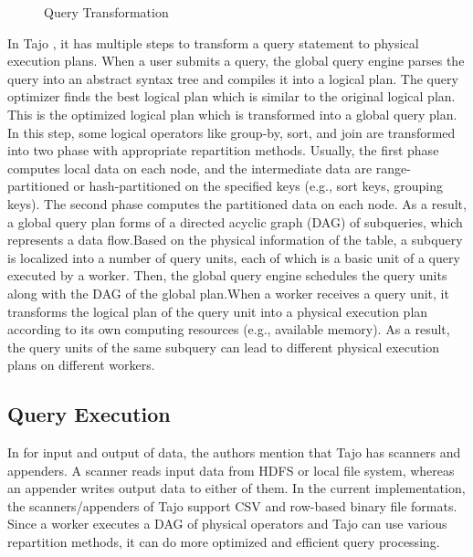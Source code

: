 \documentclass[9pt,twocolumn,twoside]{styles/osajnl}
\begin{document}
\begin{figure}[htbp]
\centering
{}
\caption{\cite{tajo-paper} Query Transformation}
\label{fig:queryplanning}
\end{figure}

\noindent
In Tajo \cite{tajo-paper} \cite{www-apache-tajo}, it has multiple
steps to transform a query statement to physical execution plans. When
a user submits a query, the global query engine parses the query into
an abstract syntax tree and compiles it into a logical plan. The query
optimizer finds the best logical plan which is similar to the original
logical plan. This is the optimized logical plan which is transformed
into a global query plan. In this step, some logical operators like
group-by, sort, and join are transformed into two phase with
appropriate repartition methods. Usually, the first phase computes
local data on each node, and the intermediate data are
range-partitioned or hash-partitioned on the specified keys (e.g.,
sort keys, grouping keys). The second phase computes the partitioned
data on each node. As a result, a global query plan forms of a
directed acyclic graph (DAG) of subqueries, which represents a data
flow.Based on the physical information of the table, a subquery is
localized into a number of query units, each of which is a basic unit
of a query executed by a worker. Then, the global query engine
schedules the query units along with the DAG of the global
plan.\newline \newline When a worker receives a query unit, it
transforms the logical plan of the query unit into a physical
execution plan according to its own computing resources (e.g.,
available memory). As a result, the query units of the same subquery
can lead to different physical execution plans on different workers.

\subsection{Query Execution}
In \cite{tajo-paper} for input and output of data, the authors mention
that Tajo has scanners and appenders. A scanner reads input data from
HDFS or local file system, whereas an appender writes output data to
either of them. In the current implementation, the scanners/appenders
of Tajo support CSV and row-based binary file formats. Since a worker
executes a DAG of physical operators and Tajo can use various
repartition methods, it can do more optimized and efficient query
processing.
\end{document}
